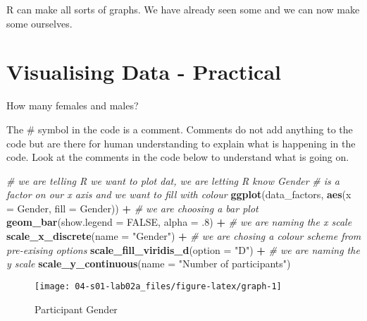 \documentclass[]{book}
\newenvironment{Shaded}{\begin{snugshade}}{\end{snugshade}}
\newcommand{\CommentTok}[1]{\textcolor[rgb]{0.56,0.35,0.01}{\textit{#1}}}
\newcommand{\DataTypeTok}[1]{\textcolor[rgb]{0.13,0.29,0.53}{#1}}
\newcommand{\FloatTok}[1]{\textcolor[rgb]{0.00,0.00,0.81}{#1}}
\newcommand{\KeywordTok}[1]{\textcolor[rgb]{0.13,0.29,0.53}{\textbf{#1}}}
\newcommand{\NormalTok}[1]{#1}
\newcommand{\OperatorTok}[1]{\textcolor[rgb]{0.81,0.36,0.00}{\textbf{#1}}}
\newcommand{\OtherTok}[1]{\textcolor[rgb]{0.56,0.35,0.01}{#1}}
\newcommand{\StringTok}[1]{\textcolor[rgb]{0.31,0.60,0.02}{#1}}
\begin{document}
R can make all sorts of graphs. We have already seen some and we can now make some ourselves.

\hypertarget{visualising-data---practical}{%
\section{Visualising Data - Practical}\label{visualising-data---practical}}

How many females and males?

The \# symbol in the code is a comment. Comments do not add anything to the code but are there for human understanding to explain what is happening in the code. Look at the comments in the code below to understand what is going on.

\begin{Shaded}
\begin{Highlighting}[]
\CommentTok{# we are telling R we want to plot dat, we are letting R know Gender }
\CommentTok{# is a factor on our x axis and we want to fill with colour}
\KeywordTok{ggplot}\NormalTok{(data_factors, }\KeywordTok{aes}\NormalTok{(}\DataTypeTok{x =}\NormalTok{ Gender, }\DataTypeTok{fill =}\NormalTok{ Gender)) }\OperatorTok{+}
\StringTok{  }\CommentTok{# we are choosing a bar plot}
\StringTok{  }\KeywordTok{geom_bar}\NormalTok{(}\DataTypeTok{show.legend =} \OtherTok{FALSE}\NormalTok{, }\DataTypeTok{alpha =} \FloatTok{.8}\NormalTok{) }\OperatorTok{+}
\StringTok{  }\CommentTok{# we are naming the x scale}
\StringTok{  }\KeywordTok{scale_x_discrete}\NormalTok{(}\DataTypeTok{name =} \StringTok{"Gender"}\NormalTok{) }\OperatorTok{+}
\StringTok{  }\CommentTok{# we are chosing a colour scheme from pre-exising options}
\StringTok{  }\KeywordTok{scale_fill_viridis_d}\NormalTok{(}\DataTypeTok{option =} \StringTok{"D"}\NormalTok{) }\OperatorTok{+}
\StringTok{  }\CommentTok{# we are naming the y scale}
\StringTok{  }\KeywordTok{scale_y_continuous}\NormalTok{(}\DataTypeTok{name =} \StringTok{"Number of participants"}\NormalTok{)}
\end{Highlighting}
\end{Shaded}

\begin{figure}

{\centering \texttt{[image: 04-s01-lab02a\_files/figure-latex/graph-1]} 

}

\caption{Participant Gender}\label{fig:graph}
\end{figure}
\end{document}
